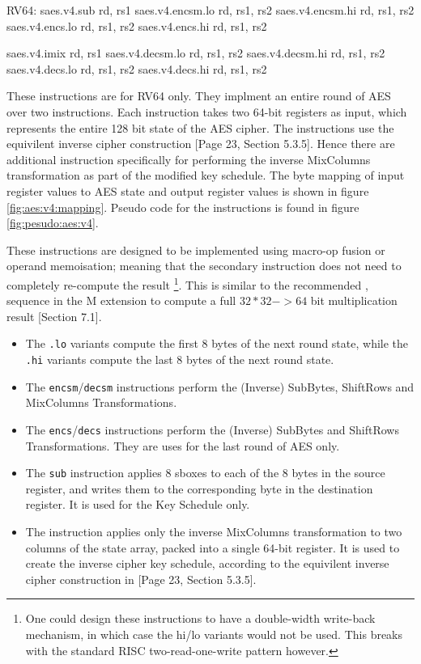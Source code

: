 \begin{cryptoisa}
RV64:
    saes.v4.sub      rd, rs1
    saes.v4.encsm.lo rd, rs1, rs2
    saes.v4.encsm.hi rd, rs1, rs2
    saes.v4.encs.lo  rd, rs1, rs2
    saes.v4.encs.hi  rd, rs1, rs2

    saes.v4.imix     rd, rs1
    saes.v4.decsm.lo rd, rs1, rs2
    saes.v4.decsm.hi rd, rs1, rs2
    saes.v4.decs.lo  rd, rs1, rs2
    saes.v4.decs.hi  rd, rs1, rs2
\end{cryptoisa}

These instructions are for RV64 only.
They implment an entire round of AES over two instructions.
Each instruction takes two 64-bit registers as input, which represents
the entire 128 bit state of the AES cipher.
The instructions use the equivilent inverse cipher construction
\cite{nist:fips:197}[Page 23, Section 5.3.5].
Hence there are additional instruction specifically for performing the
inverse MixColumns transformation as part of the modified key schedule.
The byte mapping of input register values to AES state and output register
values is shown in figure \ref{fig:aes:v4:mapping}.
Pseudo code for the instructions is found in figure
\ref{fig:pesudo:aes:v4}.

These instructions are designed to be implemented using macro-op fusion or
operand memoisation; meaning that the secondary instruction does not
need to completely re-compute the result
\footnote{
One could design these instructions to have a double-width write-back
mechanism, in which case the hi/lo variants would not be used.
This breaks with the standard RISC two-read-one-write pattern however.
}.
This is similar to the recommended , 
sequence in the M extension to compute a full $32*32->64$ bit
multiplication result \cite{riscv:spec:user}[Section 7.1].

\begin{itemize}
\item
The {\tt *.lo} variants compute the first 8 bytes of the next round
state, while the {\tt *.hi} variants compute the last 8 bytes of the
next round state.
\item
The {\tt encsm}/{\tt decsm} instructions perform the (Inverse) SubBytes,
ShiftRows and MixColumns Transformations.
\item
The {\tt encs}/{\tt decs} instructions perform the (Inverse) SubBytes and
ShiftRows Transformations. They are uses for the last round of AES only.
\item
The {\tt sub} instruction applies 8 sboxes to each of the
8 bytes in the source register, and writes them to the corresponding
byte in the destination register.
It is used for the Key Schedule only.
\item
The  instruction applies only the inverse MixColumns
transformation to two columns of the state array, packed into a single
64-bit register.
It is used to create the inverse cipher key schedule, according to
the equivilent inverse cipher construction in
\cite{nist:fips:197}[Page 23, Section 5.3.5].
\end{itemize}

